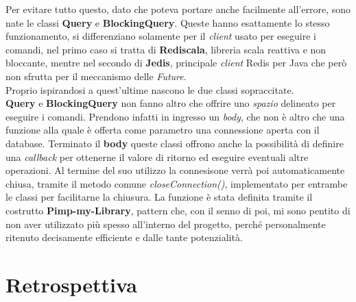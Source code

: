           Per evitare tutto questo, dato che poteva portare anche facilmente all'errore, sono nate le classi \textbf{Query} e \textbf{BlockingQuery}. Queste hanno esattamente lo stesso funzionamento, si differenziano solamente per il \textit{client} usato per eseguire i comandi, nel primo caso si tratta di \textbf{Rediscala}, libreria scala reattiva e non bloccante, mentre nel secondo di \textbf{Jedis}, principale \textit{client} Redis per Java che però non sfrutta per il meccanismo delle \textit{Future}. 
          \\
          Proprio ispirandosi a quest'ultime nascono le due classi sopraccitate. \\
          \textbf{Query} e \textbf{BlockingQuery} non fanno altro che offrire uno \textit{spazio} delineato per eseguire i comandi. Prendono infatti in ingresso un \textit{body}, che non è altro che una funzione alla quale è offerta come parametro una connessione aperta con il database. Terminato il \textbf{body} queste classi offrono anche la possibilità di definire una \textit{callback} per ottenerne il valore di ritorno ed eseguire eventuali altre operazioni.
          Al termine del suo utilizzo la connesisone verrà poi automaticamente chiusa, tramite il metodo comune \textit{closeConnection()}, implementato per entrambe le classi per facilitarne la chiusura.
          La funzione è stata definita tramite il costrutto \textbf{Pimp-my-Library}, pattern che, con il senno di poi, mi sono pentito di non aver utilizzato più spesso all'interno del progetto, perché personalmente ritenuto decisamente efficiente e dalle tante potenzialità.
          
          
          

          
          
          
      
      \clearpage
      
        
    \section{Retrospettiva}\label{sec:retrospective}


